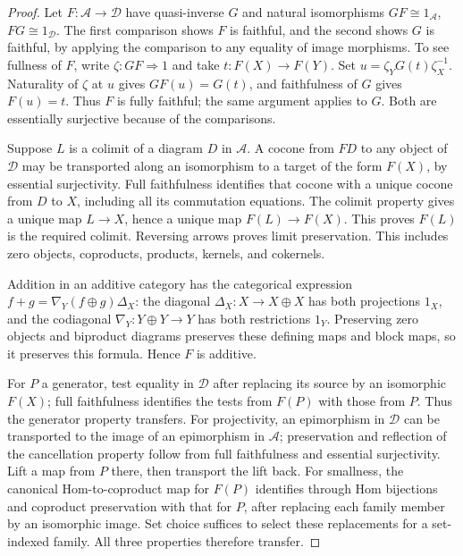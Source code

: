 \documentclass[11pt,a4paper]{article}
\theoremstyle{plain}
\theoremstyle{definition}
\begin{document}
\begin{proof}

Let \(F:\mathcal A\to\mathcal D\) have quasi-inverse \(G\) and natural isomorphisms \(GF\cong1_{\mathcal A}\), \(FG\cong1_{\mathcal D}\). The first comparison shows \(F\) is faithful, and the second shows \(G\) is faithful, by applying the comparison to any equality of image morphisms. To see fullness of \(F\), write \(\zeta:GF\Rightarrow1\) and take \(t:F(X)\to F(Y)\). Set \(u=\zeta_YG(t)\zeta_X^{-1}\). Naturality of \(\zeta\) at \(u\) gives \(GF(u)=G(t)\), and faithfulness of \(G\) gives \(F(u)=t\). Thus \(F\) is fully faithful; the same argument applies to \(G\). Both are essentially surjective because of the comparisons.

 
Suppose \(L\) is a colimit of a diagram \(D\) in \(\mathcal A\). A cocone from \(FD\) to any object of \(\mathcal D\) may be transported along an isomorphism to a target of the form \(F(X)\), by essential surjectivity. Full faithfulness identifies that cocone with a unique cocone from \(D\) to \(X\), including all its commutation equations. The colimit property gives a unique map \(L\to X\), hence a unique map \(F(L)\to F(X)\). This proves \(F(L)\) is the required colimit. Reversing arrows proves limit preservation. This includes zero objects, coproducts, products, kernels, and cokernels.

 
Addition in an additive category has the categorical expression \(f+g=\nabla_Y(f\oplus g)\Delta_X\): the diagonal \(\Delta_X:X\to X\oplus X\) has both projections \(1_X\), and the codiagonal \(\nabla_Y:Y\oplus Y\to Y\) has both restrictions \(1_Y\). Preserving zero objects and biproduct diagrams preserves these defining maps and block maps, so it preserves this formula. Hence \(F\) is additive.

 
For \(P\) a generator, test equality in \(\mathcal D\) after replacing its source by an isomorphic \(F(X)\); full faithfulness identifies the tests from \(F(P)\) with those from \(P\). Thus the generator property transfers. For projectivity, an epimorphism in \(\mathcal D\) can be transported to the image of an epimorphism in \(\mathcal A\); preservation and reflection of the cancellation property follow from full faithfulness and essential surjectivity. Lift a map from \(P\) there, then transport the lift back. For smallness, the canonical Hom-to-coproduct map for \(F(P)\) identifies through Hom bijections and coproduct preservation with that for \(P\), after replacing each family member by an isomorphic image. Set choice suffices to select these replacements for a set-indexed family. All three properties therefore transfer.


\end{proof}
 
\end{document}

